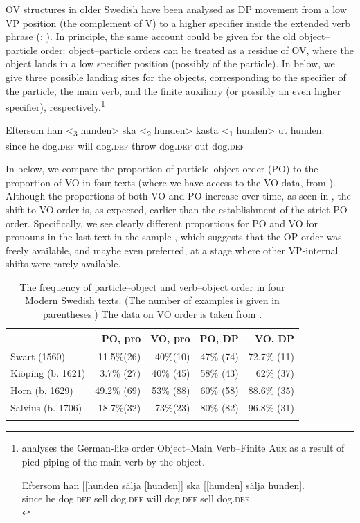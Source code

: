 \documentclass[output=paper]{langscibook}
\begin{document}
OV structures in older Swedish have been analysed as DP movement from a low VP position (the complement of V) to a higher specifier inside the extended verb phrase (\citealt{Delsing1999}; \citealt{Petzell2011, Petzell2012}). In principle, the same account could be given for the old object–particle order: object–particle orders can be treated as a residue of OV, where the object lands in a low specifier position (possibly of the particle). In  below, we give three possible landing sites for the objects, corresponding to the specifier of the particle, the main verb, and the finite auxiliary (or possibly an even higher specifier), respectively.\footnote{\citet{Petzell2012} analyses the German-like order Object–Main Verb–Finite Aux as a result of pied-piping of the main verb by the object.

    \ea
    \gll  Eftersom    han [[hunden   sälja [hunden]]   ska [[hunden]   sälja   hunden].\\
    since   he     dog.\textsc{def}   sell       dog.\textsc{def}     will   dog.\textsc{def}     sell   dog.\textsc{def}\\
    \z}


\ea\label{ex:lalu:46}
\gll Eftersom  han {<\textsubscript{3} hunden>}   ska   {<\textsubscript{2} hunden>} kasta     {<\textsubscript{1} hunden>}   ut     hunden.\\
since        he      dog\textsc{.def}  will     dog\textsc{.def}  throw        dog\textsc{.def}   out   dog\textsc{.def}\\
\z


In  below, we compare the proportion of particle–object order (PO) to the proportion of VO in four texts (where we have access to the VO data, from \citealt{Petzell2012}). Although the proportions of both VO and PO increase over time, as seen in , the shift to VO order is, as expected, earlier than the establishment of the strict PO order. Specifically, we see clearly different proportions for PO and VO for pronouns in the last text in the sample \citep{Salvius1706}, which suggests that the OP order was freely available, and maybe even preferred, at a stage where other VP-internal shifts were rarely available.


\begin{table}
\caption{The frequency of particle–object and verb–object order in four Modern Swedish texts. (The number of examples is given in parentheses.) The data on VO order is taken from \citet{Petzell2012}.}
\label{tab:lalu:3}
\begin{tabularx}{0.85\textwidth}{Xrrrr}
\lsptoprule
& PO, pro & VO, pro & PO, DP & VO, DP\\
\midrule
Swart (1560) & 11.5\%(26) & 40\%(10) & 47\% (74) & 72.7\% (11)\\
Kiöping (b. 1621) & 3.7\% (27) & 40\% (45) & 58\% (43) & 62\%   (37)\\
Horn (b. 1629) & 49.2\%   (69) & 53\%   (88) & 60\% (58) & 88.6\% (35)\\
Salvius (b. 1706) & 18.7\%(32) & 73\%(23) & 80\% (82) & 96.8\% (31)\\
\lspbottomrule
\end{tabularx}
\end{table}
\end{document}
